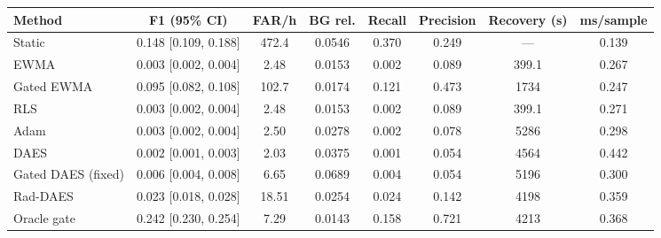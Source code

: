 \begin{tabular}{lccccccc}
\toprule
Method & F1 (95\% CI) & FAR/h & BG rel. & Recall & Precision & Recovery (s) & ms/sample \\
\midrule
Static & 0.148 [0.109, 0.188] & 472.4 & 0.0546 & 0.370 & 0.249 & --- & 0.139 \\
EWMA & 0.003 [0.002, 0.004] & 2.48 & 0.0153 & 0.002 & 0.089 & 399.1 & 0.267 \\
Gated EWMA & 0.095 [0.082, 0.108] & 102.7 & 0.0174 & 0.121 & 0.473 & 1734 & 0.247 \\
RLS & 0.003 [0.002, 0.004] & 2.48 & 0.0153 & 0.002 & 0.089 & 399.1 & 0.271 \\
Adam & 0.003 [0.002, 0.004] & 2.50 & 0.0278 & 0.002 & 0.078 & 5286 & 0.298 \\
DAES & 0.002 [0.001, 0.003] & 2.03 & 0.0375 & 0.001 & 0.054 & 4564 & 0.442 \\
Gated DAES (fixed) & 0.006 [0.004, 0.008] & 6.65 & 0.0689 & 0.004 & 0.054 & 5196 & 0.300 \\
Rad-DAES & 0.023 [0.018, 0.028] & 18.51 & 0.0254 & 0.024 & 0.142 & 4198 & 0.359 \\
Oracle gate & 0.242 [0.230, 0.254] & 7.29 & 0.0143 & 0.158 & 0.721 & 4213 & 0.368 \\
\bottomrule
\end{tabular}

